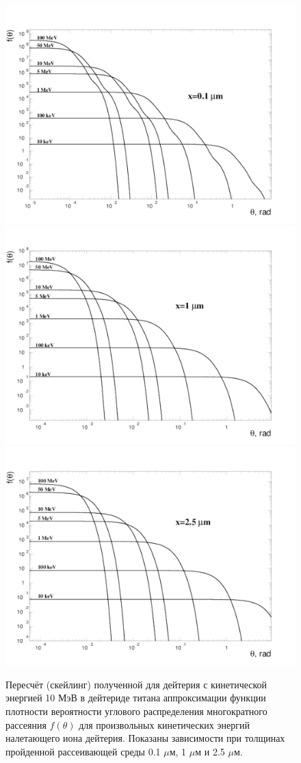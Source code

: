 \documentclass[a4paper,12pt]{article}
\begin{document}
\begin{large}
	
\begin{figure}[ht]
{
   \includegraphics[width=0.32\linewidth]{images/funtheta_0_1mkm_deuteron.pdf}
   \includegraphics[width=0.32\linewidth]{images/funtheta_1mkm_deuteron.pdf}
   \includegraphics[width=0.32\linewidth]{images/funtheta_2_5mkm_deuteron.pdf}
}
\caption{Пересчёт (скейлинг) полученной для дейтерия с кинетической энергией 10 МэВ в дейтериде титана аппроксимации функции плотности вероятности углового распределения многократного рассеяния $f(\theta)$ для произвольных кинетических энергий налетающего иона дейтерия. Показаны зависимости при толщинах пройденной рассеивающей среды 0.1 $\mu$м, 1 $\mu$м и 2.5 $\mu$м.}
\label{fig:MFthetaScalingDeuteron}
\end{figure}


\end{large}
\end{document}
